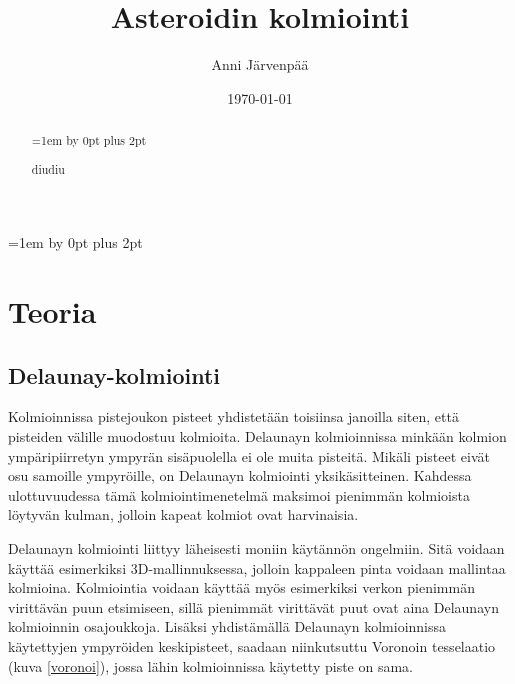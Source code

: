 \documentclass[12pt,a4paper,titlepage]{article}
\title{Asteroidin kolmiointi\vspace{0.5em}}
\author{Anni Järvenpää}
\date{\today}
\begin{document}
\maketitle
{}
\begin{abstract}
\setlength{\parindent}{0pt}
\parskip=1em \advance\parskip by 0pt plus 2pt
\onehalfspacing

\noindent
diudiu
\end{abstract}
\restoregeometry

\newpage
\thispagestyle{empty}
\tableofcontents
\newpage
\setcounter{page}{1}
\parskip=1em \advance\parskip by 0pt plus 2pt
\pagestyle{fancy}


\section{Teoria}

\subsection{Delaunay-kolmiointi}
Kolmioinnissa pistejoukon pisteet yhdistetään toisiinsa janoilla siten, että pisteiden välille muodostuu kolmioita. Delaunayn kolmioinnissa minkään kolmion ympäripiirretyn ympyrän sisäpuolella ei ole muita pisteitä. Mikäli pisteet eivät osu samoille ympyröille, on Delaunayn kolmiointi yksikäsitteinen. Kahdessa ulottuvuudessa tämä kolmiointimenetelmä maksimoi pienimmän kolmioista löytyvän kulman, jolloin kapeat kolmiot ovat harvinaisia. \cite{maur2002delaunay}

Delaunayn kolmiointi liittyy läheisesti moniin käytännön ongelmiin. Sitä voidaan käyttää esimerkiksi 3D-mallinnuksessa, jolloin kappaleen pinta voidaan mallintaa kolmioina. Kolmiointia voidaan käyttää myös esimerkiksi verkon pienimmän virittävän puun etsimiseen, sillä pienimmät virittävät puut ovat aina Delaunayn kolmioinnin osajoukkoja. Lisäksi yhdistämällä Delaunayn kolmioinnissa käytettyjen ympyröiden keskipisteet, saadaan niinkutsuttu Voronoin tesselaatio (kuva \ref{voronoi}), jossa lähin kolmioinnissa käytetty piste on sama. \cite{maur2002delaunay, peterson}
\end{document}

